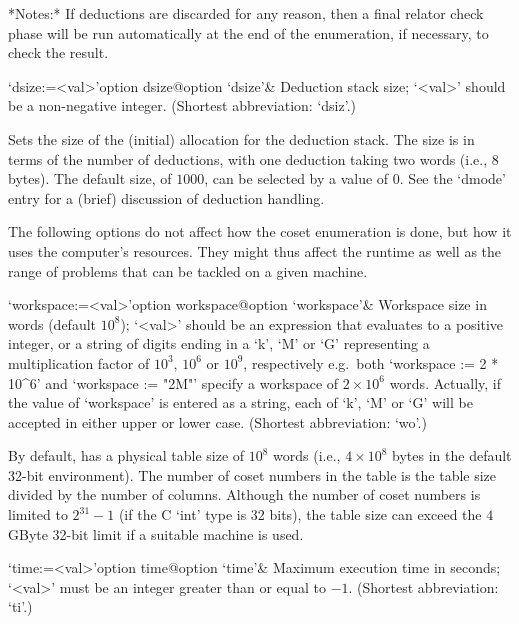 *Notes:*
If deductions are discarded for any reason, then a final relator check
phase  will be run  automatically at  the end  of the  enumeration, if
necessary, to check the result.

\>`dsize:=<val>'{option dsize}@{option `dsize'}&
Deduction stack size; `<val>' should be a non-negative integer.
(Shortest abbreviation: `dsiz'.)

Sets the  size of  the (initial) allocation  for the  deduction stack.
The size is  in terms of the number of  deductions, with one deduction
taking two words (i.e., 8 bytes).  The default size, of $1000$, can be
selected  by  a value  of  0.   See the  `dmode' entry  for a  (brief)
discussion of deduction handling.

\enditems


The following options do not affect how the coset enumeration is done,
but how it  uses the computer's resources. They  might thus affect the
runtime as  well as  the range of  problems that  can be tackled  on a
given machine.

\beginitems

\>`workspace:=<val>'{option workspace}@{option `workspace'}&
Workspace size in words (default $10^8$);
`<val>' should be an expression that evaluates to a positive  integer,
or a string of digits ending in a  `k',  `M'  or  `G'  representing  a
multiplication  factor  of  $10^3$,  $10^6$  or  $10^9$,  respectively
e.g.~both `workspace := 2 * 10^6' and `workspace :=  "2M"'  specify  a
workspace  of  $2\times10^6$  words.  Actually,  if   the   value   of
`workspace' is entered as a string, each of `k', `M' or  `G'  will  be
accepted in either upper or lower case. (Shortest abbreviation: `wo'.)

By default, {\ACE} has a physical table size of $10^8$ words (i.e., $4
\times 10^8$ bytes in the  default 32-bit environment).  The number of
coset numbers in the table is  the table size divided by the number of
columns.   Although  the  number   of  coset  numbers  is  limited  to
$2^{31}-1$ (if the C `int' type is 32 bits), the table size can exceed
the $4$GByte 32-bit limit if a suitable machine is used.

\>`time:=<val>'{option time}@{option `time'}&
Maximum execution time in seconds; `<val>' must be an integer  greater
than or equal to $-1$. (Shortest abbreviation: `ti'.)

